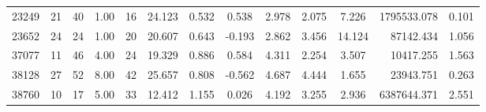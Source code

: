 \documentclass[mnsc]{informs3}
\begin{document}
\begin{APPENDICES}
\begin{longtable}{cccccccccccrc}
23249 & 21 & 40 & 1.00 & 16 & 24.123 & 0.532 & 0.538 & 2.978 & 2.075 & 7.226 & 1795533.078 & 0.101 \\
23652 & 24 & 24 & 1.00 & 20 & 20.607 & 0.643 & -0.193 & 2.862 & 3.456 & 14.124 & 87142.434 & 1.056 \\
37077 & 11 & 46 & 4.00 & 24 & 19.329 & 0.886 & 0.584 & 4.311 & 2.254 & 3.507 & 10417.255 & 1.563 \\
38128 & 27 & 52 & 8.00 & 42 & 25.657 & 0.808 & -0.562 & 4.687 & 4.444 & 1.655 & 23943.751 & 0.263 \\
38760 & 10 & 17 & 5.00 & 33 & 12.412 & 1.155 & 0.026 & 4.192 & 3.255 & 2.936 & 6387644.371 & 2.551 \\
\bottomrule
\end{longtable}









\end{APPENDICES}










%



\end{document}
